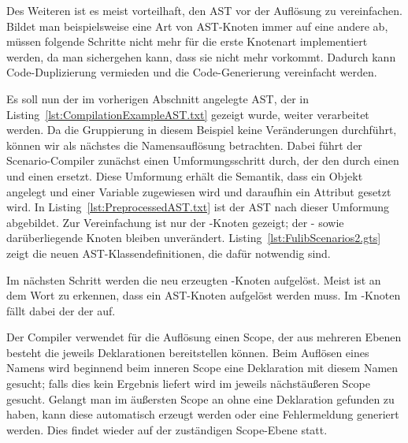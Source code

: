 Des Weiteren ist es meist vorteilhaft, den AST vor der Auflösung zu vereinfachen.
Bildet man beispielsweise eine Art von AST-Knoten immer auf eine andere ab,
müssen folgende Schritte nicht mehr für die erste Knotenart implementiert werden,
da man sichergehen kann, dass sie nicht mehr vorkommt.
Dadurch kann Code-Duplizierung vermieden und die Code-Generierung vereinfacht werden.

Es soll nun der im vorherigen Abschnitt angelegte AST, der in Listing~\ref{lst:CompilationExampleAST.txt} gezeigt wurde, weiter verarbeitet werden.
Da die Gruppierung in diesem Beispiel keine Veränderungen durchführt, können wir als nächstes die Namensauflösung betrachten.
Dabei führt der Scenario-Compiler zunächst einen Umformungsschritt durch, der den  durch einen  und einen  ersetzt.
Diese Umformung erhält die Semantik, dass ein Objekt angelegt und einer Variable zugewiesen wird und daraufhin ein Attribut gesetzt wird.
In Listing~\ref{lst:PreprocessedAST.txt} ist der AST nach dieser Umformung abgebildet.
Zur Vereinfachung ist nur der -Knoten gezeigt;
der - sowie darüberliegende Knoten bleiben unverändert.
Listing~\ref{lst:FulibScenarios2.gts} zeigt die neuen AST-Klassendefinitionen, die dafür notwendig sind.



Im nächsten Schritt werden die neu erzeugten -Knoten aufgelöst.
Meist ist an dem Wort  zu erkennen, dass ein AST-Knoten aufgelöst werden muss.
Im -Knoten fällt dabei der  der  auf.

Der Compiler verwendet für die Auflösung einen Scope, der aus mehreren Ebenen besteht die jeweils Deklarationen bereitstellen können.
Beim Auflösen eines Namens wird beginnend beim inneren Scope eine Deklaration mit diesem Namen gesucht;
falls dies kein Ergebnis liefert wird im jeweils nächstäußeren Scope gesucht.
Gelangt man im äußersten Scope an ohne eine Deklaration gefunden zu haben,
kann diese automatisch erzeugt werden oder eine Fehlermeldung generiert werden.
Dies findet wieder auf der zuständigen Scope-Ebene statt.

